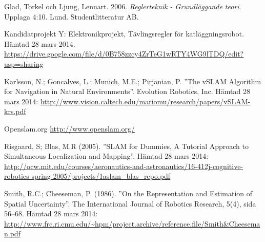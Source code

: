\documentclass[a4paper,12pt,fleqn]{article}
\begin{document}
Glad, Torkel och Ljung, Lennart. 2006. \textit{Reglerteknik - Grundläggande teori}. Upplaga 4:10. Lund. Studentlitteratur AB.

Kandidatprojekt Y: Elektronikprojekt, Tävlingsregler för katläggningsrobot. Hämtad 28 mars 2014.  \url{https://drive.google.com/file/d/0B758zzcy4ZrTeG1wRTY4WG9lTDQ/edit?usp=sharing}

Karlsson, N.; Goncalves, L.; Munich, M.E.; Pirjanian, P.
''The vSLAM Algorithm for Navigation in Natural Environments''. Evolution Robotics, Inc. Hämtad 28 mars 2014:
\url{http://www.vision.caltech.edu/mariomu/research/papers/vSLAM-krs.pdf}

Openslam.org
\url{http://www.openslam.org/}

Risgaard, S; Blas, M.R (2005).
''SLAM for Dummies, A Tutorial Approach to Simultaneous Localization and Mapping''. 
Hämtad 28 mars 2014:
\url{http://ocw.mit.edu/courses/aeronautics-and-astronautics/16-412j-cognitive-robotics-spring-2005/projects/1aslam_blas_repo.pdf}

Smith, R.C.; Cheeseman, P. (1986). ''On the Representation and Estimation of Spatial Uncertainty''. The
International Journal of Robotics Research, 5(4), sida 56–68. Hämtad
28 mars 2014:
\url{http://www.frc.ri.cmu.edu/~hpm/project.archive/reference.file/Smith&Cheeseman.pdf}
\end{document}
